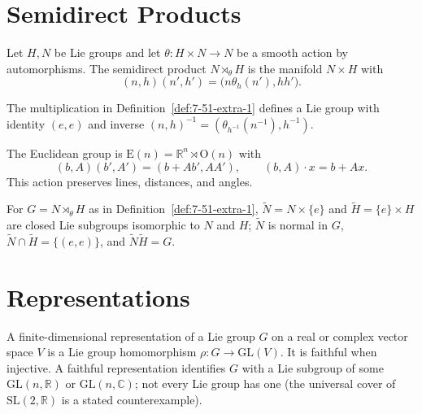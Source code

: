 \section{Semidirect Products}

\begin{definition}
\label{def:7-51-extra-1}




Let $H,N$ be Lie groups and let $\theta:H\times N\to N$ be a smooth action by automorphisms. The semidirect product $N\rtimes_\theta H$ is the manifold $N\times H$ with
\[
(n,h)(n',h')=\bigl(n\theta_h(n'),hh'\bigr).
\]
\end{definition}

\begin{proposition}
\label{exer:7-31}




The multiplication in Definition~\ref{def:7-51-extra-1} defines a Lie group
with identity $(e,e)$ and inverse
$(n,h)^{-1}=(\theta_{h^{-1}}(n^{-1}),h^{-1})$.
\end{proposition}

\begin{example}
\label{ex:7-32}




The Euclidean group is $\mathrm E(n)=\mathbb R^n\rtimes\mathrm O(n)$ with
\[
(b,A)(b',A')=(b+Ab',AA'),\qquad (b,A)\cdot x=b+Ax.
\]
This action preserves lines, distances, and angles.
\end{example}

\begin{proposition}
\label{prop:7-33}




For $G=N\rtimes_\theta H$ as in Definition~\ref{def:7-51-extra-1},
$\widetilde N=N\times\{e\}$ and $\widetilde H=\{e\}\times H$ are closed Lie
subgroups isomorphic to $N$ and $H$; $\widetilde N$ is normal in $G$,
$\widetilde N\cap\widetilde H=\{(e,e)\}$, and
$\widetilde N\widetilde H=G$.
\end{proposition}


\section{Representations}

\begin{definition}
\label{def:7-52-extra-1}




A finite-dimensional representation of a Lie group $G$ on a real or complex vector space $V$ is a Lie group homomorphism $\rho:G\to\mathrm{GL}(V)$. It is faithful when injective. A faithful representation identifies $G$ with a Lie subgroup of some $\mathrm{GL}(n,\mathbb R)$ or $\mathrm{GL}(n,\mathbb C)$; not every Lie group has one (the universal cover of $\mathrm{SL}(2,\mathbb R)$ is a stated counterexample).
\end{definition}

